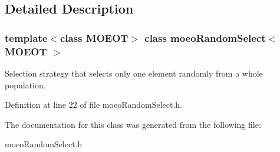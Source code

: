 \subsection{Detailed Description}
\subsubsection*{template$<$class MOEOT$>$ class moeo\-Random\-Select$<$ MOEOT $>$}

Selection strategy that selects only one element randomly from a whole population. 



Definition at line 22 of file moeo\-Random\-Select.h.

The documentation for this class was generated from the following file:\begin{CompactItemize}
\item 
moeo\-Random\-Select.h\end{CompactItemize}
